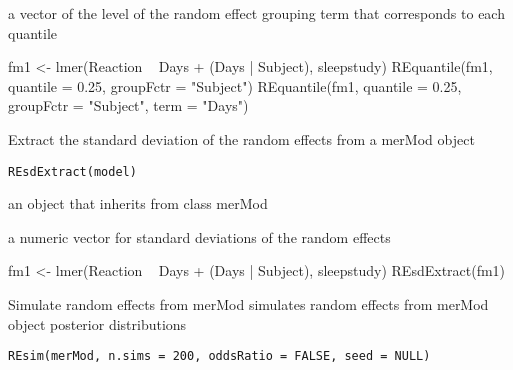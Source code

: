 \documentclass[letterpaper]{book}
\begin{document}
%
\begin{Value}
a vector of the level of the random effect grouping term that corresponds
to each quantile
\end{Value}
%
\begin{Examples}
\begin{ExampleCode}
fm1 <- lmer(Reaction ~ Days + (Days | Subject), sleepstudy)
REquantile(fm1, quantile = 0.25, groupFctr = "Subject")
REquantile(fm1, quantile = 0.25, groupFctr = "Subject", term = "Days")
\end{ExampleCode}
\end{Examples}
%
\begin{Description}\relax
Extract the standard deviation of the random effects from a merMod object
\end{Description}
%
\begin{Usage}
\begin{verbatim}
REsdExtract(model)
\end{verbatim}
\end{Usage}
%
\begin{Arguments}
\begin{ldescription}
\item[\code{model}] an object that inherits from class merMod
\end{ldescription}
\end{Arguments}
%
\begin{Value}
a numeric vector for standard deviations of the random effects
\end{Value}
%
\begin{Examples}
\begin{ExampleCode}
fm1 <- lmer(Reaction ~ Days + (Days | Subject), sleepstudy)
REsdExtract(fm1)
\end{ExampleCode}
\end{Examples}
%
\begin{Description}\relax
Simulate random effects from merMod
 simulates random effects from merMod object posterior distributions
\end{Description}
%
\begin{Usage}
\begin{verbatim}
REsim(merMod, n.sims = 200, oddsRatio = FALSE, seed = NULL)
\end{verbatim}
\end{Usage}
\end{document}
